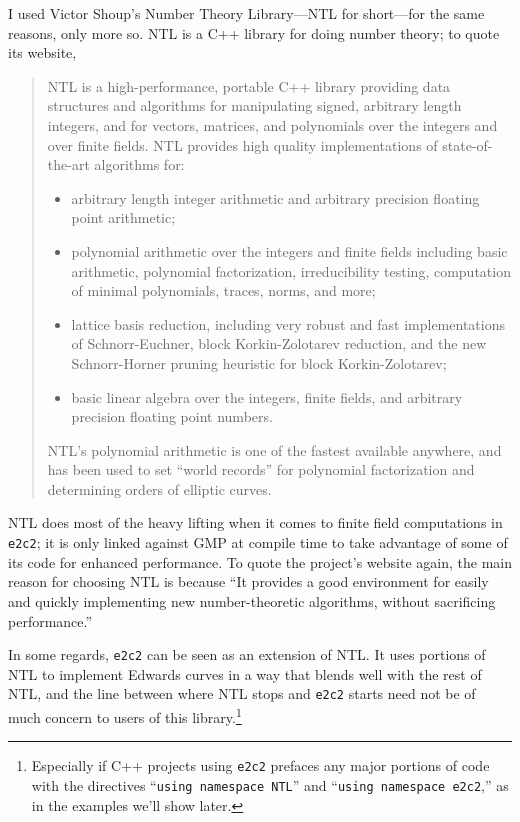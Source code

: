 I used Victor Shoup's Number Theory Library---NTL for short---for the same
    reasons, only more so.\cite{shoup2009ntl}
NTL is a C++ library for doing number theory; to quote its website,
\begin{quote}
NTL is a high-performance, portable C++ library providing data structures and
    algorithms for manipulating signed, arbitrary length integers, and for
    vectors, matrices, and polynomials over the integers and over finite
    fields.
NTL provides high quality implementations of state-of-the-art algorithms for:
\begin{itemize}
\item arbitrary length integer arithmetic and arbitrary precision floating
    point arithmetic;
\item polynomial arithmetic over the integers and finite fields including basic
    arithmetic, polynomial factorization, irreducibility testing, computation
    of minimal polynomials, traces, norms, and more;
\item lattice basis reduction, including very robust and fast implementations
    of Schnorr-Euchner, block Korkin-Zolotarev reduction, and the new
    Schnorr-Horner pruning heuristic for block Korkin-Zolotarev;
\item basic linear algebra over the integers, finite fields, and arbitrary
    precision floating point numbers.
\end{itemize}
NTL's polynomial arithmetic is one of the fastest available anywhere, and has
    been used to set ``world records'' for polynomial factorization and
    determining orders of elliptic curves.
\end{quote}
NTL does most of the heavy lifting when it comes to finite field computations
    in \texttt{e2c2}; it is only linked against GMP at compile time to take
    advantage of some of its code for enhanced performance.
To quote the project's website again, the main reason for choosing NTL is
    because ``It provides a good environment for easily and quickly
    implementing new number-theoretic algorithms, without sacrificing
    performance.''

In some regards, \texttt{e2c2} can be seen as an extension of NTL.
It uses portions of NTL to implement Edwards curves in a way that blends well
    with the rest of NTL, and the line between where NTL stops and
    \texttt{e2c2} starts need not be of much concern to users of this
    library.\footnote{Especially if C++ projects using \texttt{e2c2} prefaces
    any major portions of code with the directives
    ``\texttt{using namespace NTL}'' and ``\texttt{using namespace e2c2},'' as
    in the examples we'll show later.}

